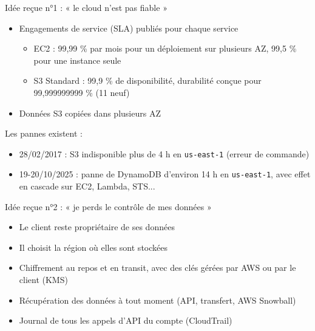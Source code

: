 \begin{frame}{Idée reçue n°1 : « le cloud n'est pas fiable »}
  \begin{itemize}
    \setlength{\itemsep}{.5em}
    \item Engagements de service (SLA) publiés pour chaque service
    \begin{itemize}
      \item EC2 : 99,99 \% par mois pour un déploiement sur plusieurs AZ, 99,5 \% pour une instance seule
      \item S3 Standard : 99,9 \% de disponibilité, durabilité conçue pour 99,999999999 \% (11 neuf)
    \end{itemize}
    \item Données S3 copiées dans plusieurs AZ
  \end{itemize}
  \bigskip
  \attention Les pannes existent :
  \begin{itemize}
    \item 28/02/2017 : S3 indisponible plus de 4 h en \texttt{us-east-1} (erreur de commande)
    \item 19-20/10/2025 : panne de DynamoDB d'environ 14 h en \texttt{us-east-1}, avec effet en cascade sur EC2, Lambda, STS...
  \end{itemize}
\end{frame}

\begin{frame}{Idée reçue n°2 : « je perds le contrôle de mes données »}
  \begin{itemize}
    \setlength{\itemsep}{.6em}
    \item Le client reste propriétaire de ses données
    \item Il choisit la région où elles sont stockées
    \item Chiffrement au repos et en transit, avec des clés gérées par AWS ou par le client (KMS)
    \item Récupération des données à tout moment (API, transfert, AWS Snowball)
    \item Journal de tous les appels d'API du compte (CloudTrail)
  \end{itemize}
\end{frame}

